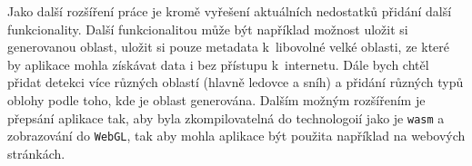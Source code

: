 Jako další rozšíření práce je kromě vyřešení aktuálních nedostatků přidání další funkcionality. Další funkcionalitou může být například možnost uložit si generovanou oblast, uložit si pouze metadata k~libovolné velké oblasti, ze které by aplikace mohla získávat data i bez přístupu k~internetu. Dále bych chtěl přidat detekci více různých oblastí (hlavně ledovce a sníh) a přidání různých typů oblohy podle toho, kde je oblast generována. Dalším možným rozšířením je přepsání aplikace tak, aby byla zkompilovatelná do technologoií jako je \verb|wasm| a zobrazování do \verb|WebGL|, tak aby mohla aplikace být použita například na webových stránkách.



